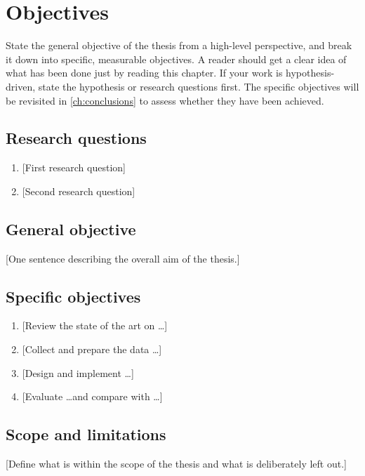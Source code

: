 \chapter{Objectives}\label{ch:objectives}

\begin{guidance}
State the general objective of the thesis from a high-level perspective, and break it
down into specific, measurable objectives. A reader should get a clear idea of what has
been done just by reading this chapter. If your work is hypothesis-driven, state the
hypothesis or research questions first. The specific objectives will be revisited in
\autoref{ch:conclusions} to assess whether they have been achieved.
\end{guidance}

\section{Research questions}\label{sec:research-questions}

\begin{enumerate}
  \renewcommand{\labelenumi}{\textbf{RQ\arabic{enumi}.}}
  \renewcommand{\theenumi}{RQ\arabic{enumi}}
  \item\label{rq:1} [First research question]
  \item\label{rq:2} [Second research question]
\end{enumerate}

\section{General objective}\label{sec:general-objective}

[One sentence describing the overall aim of the thesis.]

\section{Specific objectives}\label{sec:specific-objectives}

\begin{enumerate}
  \renewcommand{\labelenumi}{\textbf{O\arabic{enumi}.}}
  \renewcommand{\theenumi}{O\arabic{enumi}}
  \item\label{obj:1} [Review the state of the art on \dots]
  \item\label{obj:2} [Collect and prepare the data \dots]
  \item\label{obj:3} [Design and implement \dots]
  \item\label{obj:4} [Evaluate \dots and compare with \dots]
\end{enumerate}

\section{Scope and limitations}\label{sec:scope}

[Define what is within the scope of the thesis and what is deliberately left out.]

